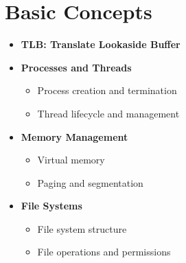 \documentclass{article}
\begin{document}
\section{Basic Concepts}
    \begin{itemize}
      \item \textbf{TLB: Translate Lookaside Buffer}
      \item \textbf{Processes and Threads}
        \begin{itemize}
          \item Process creation and termination
          \item Thread lifecycle and management
        \end{itemize}
      \item \textbf{Memory Management}
        \begin{itemize}
          \item Virtual memory
          \item Paging and segmentation
        \end{itemize}
      \item \textbf{File Systems}
        \begin{itemize}
          \item File system structure
          \item File operations and permissions
        \end{itemize}
    \end{itemize}
\end{document}
